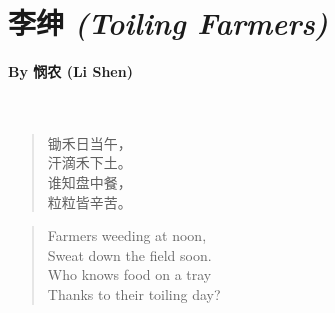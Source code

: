 \documentclass[12pt, openany, letterpaper]{memoir}
\begin{document}
\newpage
\pagestyle{empty}
\addtocounter{page}{-1}
\section*{{李绅} \emph{(Toiling Farmers)}}
\paragraph{By {悯农} (Li Shen)}~

{
\begin{verse}
	锄禾日当午，\\
	汗滴禾下土。\\
	谁知盘中餐，\\
	粒粒皆辛苦。
\end{verse}
}

\vspace{2em}
\begin{verse}
	Farmers weeding at noon,\\
	Sweat down the field soon.\\
	Who knows food on a tray\\
	Thanks to their toiling day?
\end{verse}
\end{document}
